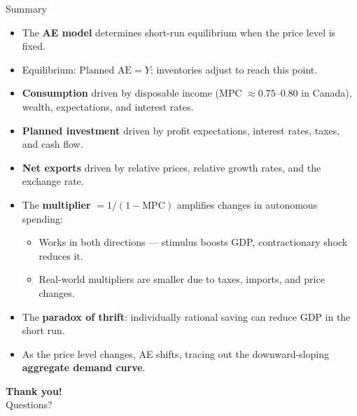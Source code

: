 \documentclass[aspectratio=169]{beamer}
\begin{document}
\begin{frame}{Summary}
\transfade
\begin{itemize}[<+->]
  \item The \textbf{AE model} determines short-run equilibrium when the price level is fixed.
  \item Equilibrium: $\text{Planned AE} = Y$; inventories adjust to reach this point.
  \item \textbf{Consumption} driven by disposable income (MPC $\approx 0.75$--$0.80$ in Canada), wealth, expectations, and interest rates.
  \item \textbf{Planned investment} driven by profit expectations, interest rates, taxes, and cash flow.
  \item \textbf{Net exports} driven by relative prices, relative growth rates, and the exchange rate.
  \item The \textbf{multiplier} $= 1/(1-\text{MPC})$ amplifies changes in autonomous spending:
  \begin{itemize}[<+->]
    \item Works in both directions --- stimulus boosts GDP, contractionary shock reduces it.
    \item Real-world multipliers are smaller due to taxes, imports, and price changes.
  \end{itemize}
  \item The \textbf{paradox of thrift}: individually rational saving can reduce GDP in the short run.
  \item As the price level changes, AE shifts, tracing out the downward-sloping \textbf{aggregate demand curve}.
\end{itemize}
\end{frame}

\begin{frame}
\centering
\Huge \textbf{Thank you!}\\[1em]
\large Questions?
\end{frame}
\end{document}

